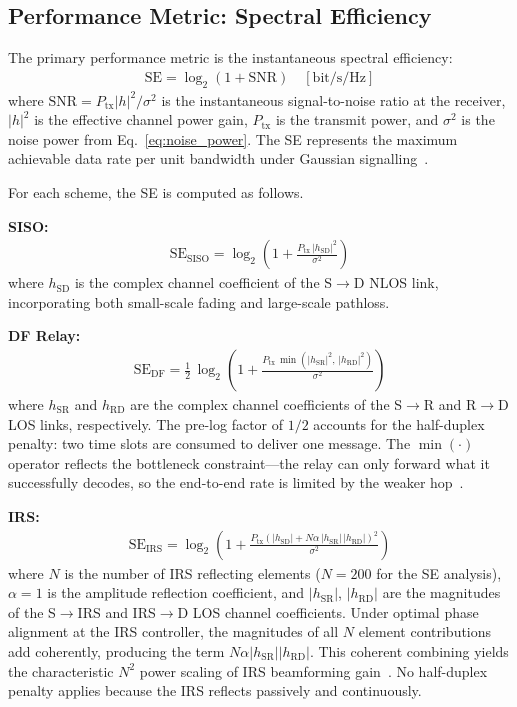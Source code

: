 \documentclass[journal]{IEEEtran} %
\begin{document}
\subsection{Performance Metric: Spectral Efficiency}

The primary performance metric is the instantaneous spectral efficiency:
\begin{align}
    \mathrm{SE} = \log_2\!\left(1 + \mathrm{SNR}\right) \quad [\text{bit/s/Hz}]
    \label{eq:se_general}
\end{align}
where $\mathrm{SNR} = P_{\mathrm{tx}} |h|^2 / \sigma^2$ is the instantaneous signal-to-noise ratio at the receiver, $|h|^2$ is the effective channel power gain, $P_{\mathrm{tx}}$ is the transmit power, and $\sigma^2$ is the noise power from Eq.~\eqref{eq:noise_power}. The SE represents the maximum achievable data rate per unit bandwidth under Gaussian signalling~\cite{goldsmith2005wireless}.

For each scheme, the SE is computed as follows.

\textbf{SISO:}
\begin{align}
    \mathrm{SE}_{\mathrm{SISO}} = \log_2\!\left(1 + \frac{P_{\mathrm{tx}}\,|h_{\mathrm{SD}}|^2}{\sigma^2}\right)
    \label{eq:se_siso}
\end{align}
where $h_{\mathrm{SD}}$ is the complex channel coefficient of the S$\to$D NLOS link, incorporating both small-scale fading and large-scale pathloss.

\textbf{DF Relay:}
\begin{align}
    \mathrm{SE}_{\mathrm{DF}} = \frac{1}{2}\,\log_2\!\left(1 + \frac{P_{\mathrm{tx}}\,\min\!\left(|h_{\mathrm{SR}}|^2,\, |h_{\mathrm{RD}}|^2\right)}{\sigma^2}\right)
    \label{eq:se_df}
\end{align}
where $h_{\mathrm{SR}}$ and $h_{\mathrm{RD}}$ are the complex channel coefficients of the S$\to$R and R$\to$D LOS links, respectively. The pre-log factor of $1/2$ accounts for the half-duplex penalty: two time slots are consumed to deliver one message. The $\min(\cdot)$ operator reflects the bottleneck constraint---the relay can only forward what it successfully decodes, so the end-to-end rate is limited by the weaker hop~\cite{laneman2004cooperative,hasna2003relay}.

\textbf{IRS:}
\begin{align}
    \mathrm{SE}_{\mathrm{IRS}} = \log_2\!\left(1 + \frac{P_{\mathrm{tx}}\left(|h_{\mathrm{SD}}| + N\alpha\,|h_{\mathrm{SR}}|\,|h_{\mathrm{RD}}|\right)^2}{\sigma^2}\right)
    \label{eq:se_irs}
\end{align}
where $N$ is the number of IRS reflecting elements ($N = 200$ for the SE analysis), $\alpha = 1$ is the amplitude reflection coefficient, and $|h_{\mathrm{SR}}|$, $|h_{\mathrm{RD}}|$ are the magnitudes of the S$\to$IRS and IRS$\to$D LOS channel coefficients. Under optimal phase alignment at the IRS controller, the magnitudes of all $N$ element contributions add coherently, producing the term $N\alpha|h_{\mathrm{SR}}||h_{\mathrm{RD}}|$. This coherent combining yields the characteristic $N^2$ power scaling of IRS beamforming gain~\cite{wu2020irs_tutorial,bjornson2020irs}. No half-duplex penalty applies because the IRS reflects passively and continuously.
\end{document}
